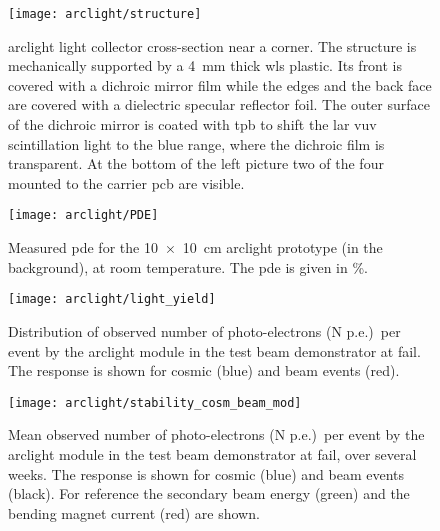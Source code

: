 \begin{figure}[htbp]
	\centering
	\texttt{[image: arclight/structure]}
	\caption[ light collector cross-section]{%
		\acrshort{arclight} light collector cross-section near a corner.
		The structure is mechanically supported by a \SI{4}{\milli\metre} thick \acrshort{wls} plastic.
		Its front is covered with a dichroic mirror film while the edges and the back face are covered with a dielectric specular reflector foil.
		The outer surface of the dichroic mirror is coated with \acrshort{tpb} to shift the \acrshort{lar} \acrshort{vuv} scintillation light to the blue range, where the dichroic film is transparent.
		At the bottom of the left picture two of the four  mounted to the carrier \acrshort{pcb} are visible.
	}
	\label{fig:arclight_structure}
\end{figure}

\begin{figure}[htbp]
	\centering
	\texttt{[image: arclight/PDE]}
	\caption[Measured  ]{%
		Measured \acrshort{pde} for the \SI{10 x 10}{\centi\metre} \acrshort{arclight} prototype (in the background), at room temperature.
		The \acrshort{pde} is given in \si{\percent}.
	}
	\label{fig:arclight_pde}
\end{figure}

\begin{figure}[htbp]
	\centering
	\texttt{[image: arclight/light\_yield]}
	\caption[\pixlar{}  response]{%
		Distribution of observed number of photo-electrons (N p.e.)\ per event by the \acrshort{arclight} module in the \pixlar{} test beam demonstrator at \acrshort{fail}.
		The response is shown for cosmic (blue) and beam events (red).
	}
	\label{fig:arclight_pixlar_response}
\end{figure}

\begin{figure}[htbp]
	\centering
	\texttt{[image: arclight/stability\_cosm\_beam\_mod]}
	\caption[\pixlar{}  response stability]{%
		Mean observed number of photo-electrons (N p.e.)\ per event by the \acrshort{arclight} module in the \pixlar{} test beam demonstrator at \acrshort{fail}, over several weeks.
		The response is shown for cosmic (blue) and beam events (black).
		For reference the secondary beam energy (green) and the bending magnet current (red) are shown.
	}
	\label{fig:arclight_pixlar_stability}
\end{figure}

